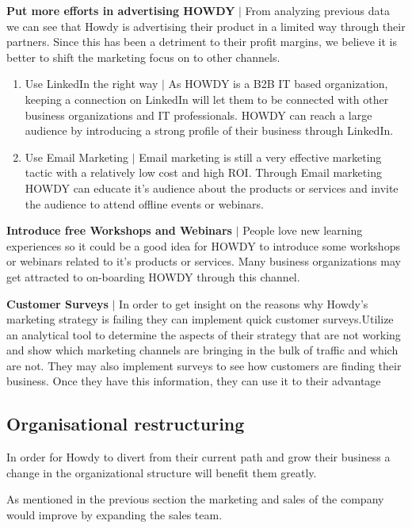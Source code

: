 \noindent \textbf{Put more efforts in advertising HOWDY} $|$ From analyzing previous data we can see that Howdy is advertising their product in a limited way through their partners. Since this has been a detriment to their profit margins, we believe it is better to shift the marketing focus on to other channels.

\begin{enumerate}
    \item Use LinkedIn the right way $|$ As HOWDY is a B2B IT based organization, keeping a connection on LinkedIn will let them to be connected with other business organizations and IT professionals. HOWDY can reach a large audience by introducing a strong profile of their business through LinkedIn.
    \item Use Email Marketing $|$ Email marketing is still a very effective marketing tactic with a relatively low cost and high ROI. Through Email marketing HOWDY can educate it’s audience about the products or services and invite the audience to attend offline events or webinars.
\end{enumerate}

\noindent \textbf{Introduce free Workshops and Webinars} $|$ People love new learning experiences so it could be a good idea for HOWDY to introduce some workshops or webinars related to it’s products or services. Many business organizations may get attracted to on-boarding HOWDY through this channel.

\noindent \textbf{Customer Surveys} $|$ In order to get insight on the reasons why Howdy's marketing strategy is failing they can implement quick customer surveys.Utilize an analytical tool to determine the aspects of their strategy that are not working and show which marketing channels are bringing in the bulk of traffic and which are not. They may also implement surveys to see how customers are finding their business. Once they have this information, they can use it to their advantage
 
\subsection{Organisational restructuring}
In order for Howdy to divert from their current path and grow their business a change in the organizational structure will benefit them greatly.

\noindent As mentioned in the previous section the marketing and sales of the company would improve by expanding the sales team.

